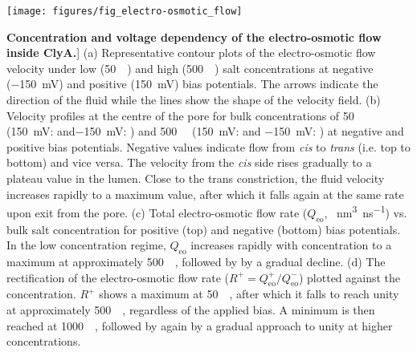 \begin{figure*}[htbp]

\centering

\texttt{[image: figures/fig\_electro-osmotic\_flow]}

\caption
[\textbf{Concentration and voltage dependency of the electro-osmotic flow inside ClyA.}]
{
(a) Representative contour plots of the electro-osmotic flow velocity under low (\SI{50}{\milli\Molar}) and
high (\SI{500}{\milli\Molar}) salt concentrations at negative (\SI{-150}{\milli\volt}) and positive (\SI{+150}{\milli\volt}) bias potentials.
The arrows indicate the direction of the fluid while the lines show the shape of the velocity field.
(b) Velocity profiles at the centre of the pore for bulk concentrations of \SI{50}{\milli\Molar}
(\SI{+150}{\milli\volt}:  and\SI{-150}{\milli\volt}: ) 
and \SI{500}{\milli\Molar} (\SI{+150}{\milli\volt}:  and 
\SI{-150}{\milli\volt}: ) at negative and positive bias potentials.
Negative values indicate flow from \textit{cis} to \textit{trans} (i.e. top to bottom) and vice versa.
The velocity from the \textit{cis} side rises gradually to a plateau value in the lumen.
Close to the trans constriction, the fluid velocity increases rapidly to a maximum value,
after which it falls again at the same rate upon exit from the pore.
(c) Total electro-osmotic flow rate ($Q_\textrm{eo}$, \SI{}{\cubic\nano\metre\per\nano\second}) vs. bulk salt concentration for positive (top) and negative (bottom) bias potentials.
In the low concentration regime, $Q_\textrm{eo}$ increases rapidly with concentration to a maximum at approximately \SI{500}{\milli\Molar}, followed by by a gradual decline.
(d) The rectification of the electro-osmotic flow rate ($R^+=Q_\textrm{eo}^+/Q_\textrm{eo}^-$) plotted against the concentration.
$R^+$ shows a maximum at \SI{50}{\milli\Molar}, after which it falls to reach unity at approximately \SI{500}{\milli\Molar}, regardless of the applied bias.
A minimum is then reached at \SI{1000}{\milli\Molar}, followed by again by a gradual approach to unity at higher concentrations.
}

\label{fig:electro-osmotic_flow}

\end{figure*}
